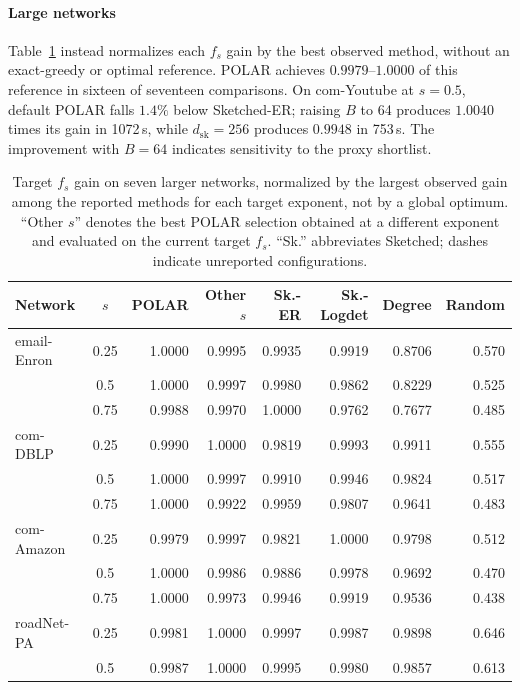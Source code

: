 \documentclass[conference]{IEEEtran}
\theoremstyle{definition}
\newcommand{\POLAR}{\textsc{POLAR}}
\newcommand{\dsk}{d_{\mathrm{sk}}}
\begin{document}
\paragraph{Large networks}
Table~\ref{tab:large} instead normalizes each $f_s$ gain by the best
observed method, without an exact-greedy or optimal reference. \POLAR{}
achieves $0.9979$--$1.0000$ of this reference in sixteen of seventeen
comparisons. On com-Youtube at $s=0.5$, default \POLAR{} falls $1.4\%$
below Sketched-ER; raising $B$ to 64 produces $1.0040$ times its gain
in 1072\,s, while $\dsk=256$ produces $0.9948$ in 753\,s. The improvement
with $B=64$ indicates sensitivity to the proxy shortlist.

\begin{table}[!t]
\centering
\caption{Target $f_s$ gain on seven larger networks, normalized by the
largest observed gain among the reported methods for each target
exponent, not by a global optimum. ``Other $s$'' denotes the best
\POLAR{} selection obtained at a different exponent and evaluated
on the current target $f_s$. ``Sk.'' abbreviates Sketched; dashes
indicate unreported configurations.}
\label{tab:large}
\footnotesize
\setlength{\tabcolsep}{2.3pt}
\renewcommand{\arraystretch}{1.04}
\begin{tabular}{@{}lc rrrrrr@{}}
\toprule
Network & $s$ & \POLAR{} & Other $s$ & Sk.-ER & Sk.-Logdet & Degree & Random\\
\midrule
email-Enron & 0.25 & 1.0000 & 0.9995 & 0.9935 & 0.9919 & 0.8706 & 0.570\\
 & 0.5 & 1.0000 & 0.9997 & 0.9980 & 0.9862 & 0.8229 & 0.525\\
 & 0.75 & 0.9988 & 0.9970 & 1.0000 & 0.9762 & 0.7677 & 0.485\\
com-DBLP & 0.25 & 0.9990 & 1.0000 & 0.9819 & 0.9993 & 0.9911 & 0.555\\
 & 0.5 & 1.0000 & 0.9997 & 0.9910 & 0.9946 & 0.9824 & 0.517\\
 & 0.75 & 1.0000 & 0.9922 & 0.9959 & 0.9807 & 0.9641 & 0.483\\
com-Amazon & 0.25 & 0.9979 & 0.9997 & 0.9821 & 1.0000 & 0.9798 & 0.512\\
 & 0.5 & 1.0000 & 0.9986 & 0.9886 & 0.9978 & 0.9692 & 0.470\\
 & 0.75 & 1.0000 & 0.9973 & 0.9946 & 0.9919 & 0.9536 & 0.438\\
roadNet-PA & 0.25 & 0.9981 & 1.0000 & 0.9997 & 0.9987 & 0.9898 & 0.646\\
 & 0.5 & 0.9987 & 1.0000 & 0.9995 & 0.9980 & 0.9857 & 0.613\\

\end{tabular}
\end{table}
\end{document}
